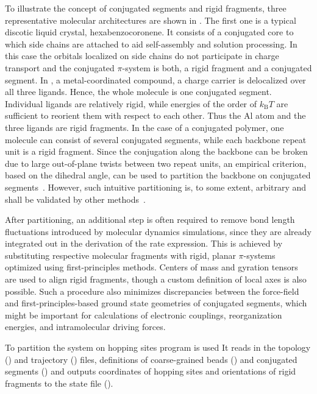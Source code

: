 To illustrate the concept of conjugated segments and rigid fragments, three representative molecular architectures are shown in . The first one is a typical discotic liquid crystal, hexabenzocoronene. It consists of a conjugated core to which side chains are attached to aid self-assembly and solution processing. In this case the orbitals localized on side chains do not participate in charge transport and the conjugated $\pi$-system is both, a rigid fragment and a conjugated segment. 
%
In \Alq, a metal-coordinated compound, a charge carrier is delocalized over all three ligands. Hence, the whole molecule is one conjugated segment. Individual ligands are relatively rigid, while energies of the order of $k_\text{B}T$ are sufficient to reorient them with respect to each other. Thus the Al atom and the three ligands are rigid fragments.
%
In the case of a conjugated polymer, one molecule can consist of several conjugated segments, while each backbone repeat unit is a rigid fragment. Since the conjugation along the backbone can be broken due to large out-of-plane twists between two repeat units, an empirical criterion, based on the dihedral angle, can be used to partition the backbone on conjugated segments~\cite{ruehle_multiscale_2010}. However, such intuitive partitioning is, to some extent, arbitrary and shall be validated by other methods~\cite{vukmirovi_charge_2008,vukmirovi_charge_2009,mcmahon_ad_2009}. 

After partitioning, an additional step is often required to remove bond length fluctuations introduced by molecular dynamics simulations, since they are already integrated out in the derivation of the rate expression. This is achieved by substituting respective molecular fragments with  rigid, planar $\pi$-systems optimized using first-principles methods. Centers of mass and gyration tensors are used to align rigid fragments, though a custom definition of local axes is also possible. Such a procedure also minimizes discrepancies between the force-field and first-principles-based ground state geometries of conjugated segments, which might be important for calculations of electronic couplings, reorganization energies, and intramolecular driving forces. 

To partition the system on hopping sites \ctpmap program is used
\vskip 0.1cm
{\noindent \small \ctpmap \tpl \topology \trj \trajectory \csg \xmlcsg \seg \xmlsegments  \sql \sqlstate}
\vskip 0.1cm
It reads in the \gromacs topology (\topology) and trajectory (\trajectory) files, definitions of coarse-grained beads (\xmlcsg) and conjugated segments (\xmlsegments) and outputs coordinates of hopping sites and orientations of rigid fragments to the  state file (\sqlstate).

